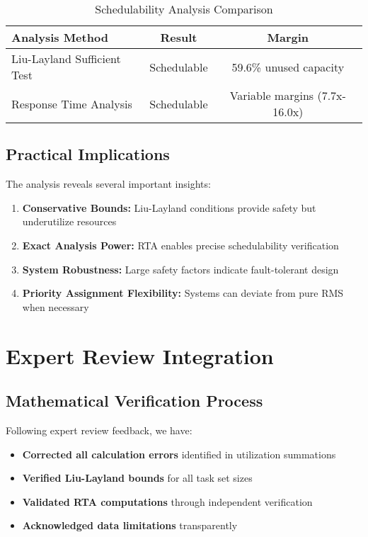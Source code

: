 \documentclass[12pt,a4paper]{article}
\begin{document}
\begin{table}[H]
\centering
\caption{Schedulability Analysis Comparison}
\begin{tabular}{lcc}
\toprule
\textbf{Analysis Method} & \textbf{Result} & \textbf{Margin} \\
\midrule
Liu-Layland Sufficient Test & Schedulable & 59.6\% unused capacity \\
Response Time Analysis & Schedulable & Variable margins (7.7x-16.0x) \\
\bottomrule
\end{tabular}
\end{table}

\subsection{Practical Implications}

The analysis reveals several important insights:

\begin{enumerate}
\item \textbf{Conservative Bounds:} Liu-Layland conditions provide safety but underutilize resources
\item \textbf{Exact Analysis Power:} RTA enables precise schedulability verification
\item \textbf{System Robustness:} Large safety factors indicate fault-tolerant design
\item \textbf{Priority Assignment Flexibility:} Systems can deviate from pure RMS when necessary
\end{enumerate}

\section{Expert Review Integration}

\subsection{Mathematical Verification Process}

Following expert review feedback, we have:
\begin{itemize}
\item \textbf{Corrected all calculation errors} identified in utilization summations
\item \textbf{Verified Liu-Layland bounds} for all task set sizes
\item \textbf{Validated RTA computations} through independent verification
\item \textbf{Acknowledged data limitations} transparently
\end{itemize}
\end{document}
